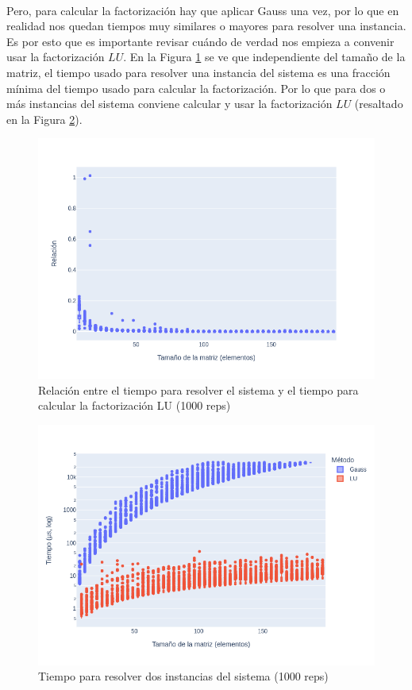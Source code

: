 \documentclass[12pt]{article}
\begin{document}
\paragraph{} Pero, para calcular la factorización hay que aplicar Gauss una vez, por lo que en realidad nos quedan tiempos muy similares o mayores para resolver una instancia. \\
Es por esto que es importante revisar cuándo de verdad nos empieza a convenir usar la factorización \(LU\). En la Figura \ref{fig:pct_lu.time} se ve que independiente del tamaño de la matriz, el tiempo usado para resolver una instancia del sistema es una fracción mínima del tiempo usado para calcular la factorización. Por lo que para dos o más instancias del sistema conviene calcular y usar la factorización \(LU\) (resaltado en la Figura \ref{fig:time.2solve}). \\

\begin{figure}[H]
\centering
\includegraphics[scale=0.5]{times.1.t_pct_lu}
\caption{Relación entre el tiempo para resolver el sistema y el tiempo para calcular la factorización LU (1000 reps)}
\label{fig:pct_lu.time}
\end{figure}

\begin{figure}[H]
\centering
\includegraphics[scale=0.5]{times.2.t_solve}
\caption{Tiempo para resolver dos instancias del sistema (1000 reps)}
\label{fig:time.2solve}
\end{figure}
\end{document}
